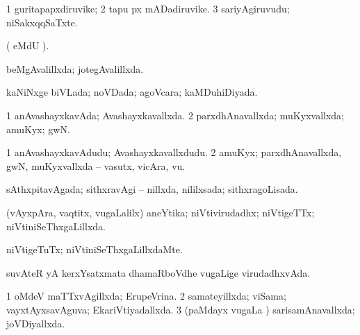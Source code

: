 {\bentry
{} 
\gl{\nA}
\expl{}
\bmng
\bnum
\num{1} guritapapxdiruvike; 
\num{2} tapu px mADadiruvike. 
\num{3} sariyAgiruvudu; niSakxqqSaTxte. 
\enum
\emng
\eentry

\bentry
{} 
\gl{\gu}
\expl{}
\bmng
\emng
\eentry

\bentry
{} 
\gl{\saMkiSx}
\expl{}
\bmng
( eMdU \parx).  
\emng
\eentry

\bentry
{} 
\gl{\gu}
\expl{}
\bmng
 beMgAvalillxda; jotegAvalillxda. 
\emng
\eentry

\bentry
{} 
\gl{\gu}
\expl{}
\bmng
 kaNiNxge biVLada; noVDada; agoVcara; kaMDuhiDiyada. 
\emng
\eentry

\bentry
{} 
\gl{\gu}
\expl{}
\bmng
\bnum
\num{1} anAvashayxkavAda; Avashayxkavallxda. 
\num{2} parxdhAnavallxda; muKyxvallxda; amuKyx; gwN. 
\enum
\emng
\eentry

\bentry
{} 
\gl{\nA}
\expl{}
\bmng
\bnum
\num{1} anAvashayxkavAdudu; Avashayxkavallxdudu. 
\num{2} amuKyx; parxdhAnavallxda, gwN, muKyxvallxda -- vasutx, vicAra, \mo vu. 
\enum
\emng
\eentry

\bentry
{} 
\gl{\gu}
\expl{}
\bmng
 sAthxpitavAgada; sithxravAgi -- nillxda, nililxsada; sithxragoLisada. 
\emng
\eentry

\bentry
{} 
\gl{\gu}
\expl{}
\bmng
 (vAyxpAra, vaqtitx, \mo vugaLalilx) aneYtika; niVtivirudadhx; niVtigeTTx; niVtiniSeThxgaLillxda. 
\emng
\eentry

\bentry
{} 
\gl{\kirxvi}
\expl{}
\bmng
 niVtigeTuTx; niVtiniSeThxgaLillxdaMte. 
\emng
\eentry

\bentry
{} 
\gl{\gu}
\expl{}
\bmng
 suvAteR yA kerxYsatxmata dhamaRboVdhe \mo vugaLige virudadhxvAda. 
\emng
\eentry

\bentry
{} 
\gl{\gu}
\expl{}
\bmng
\bnum
\num{1} oMdeV maTTxvAgillxda; ErupeVrina. 
\num{2} samateyillxda; viSama; vayxtAyxsavAguva; EkariVtiyadallxda. 
\num{3} (paMdayx \mo vugaLa \vi) sarisamAnavallxda; joVDiyallxda. 
\enum
\emng
\eentry

}
